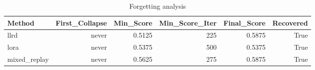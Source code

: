 \begin{table}[htbp]
\centering
\caption{Forgetting analysis}
\label{tab:forgetting}
\begin{tabular}{lrrrrr}
\toprule
\textbf{Method} & \textbf{First\_Collapse} & \textbf{Min\_Score} & \textbf{Min\_Score\_Iter} & \textbf{Final\_Score} & \textbf{Recovered} \\
\midrule
llrd & never & 0.5125 & 225 & 0.5875 & True \\
lora & never & 0.5375 & 500 & 0.5375 & True \\
mixed\_replay & never & 0.5625 & 275 & 0.5875 & True \\
\bottomrule
\end{tabular}
\end{table}